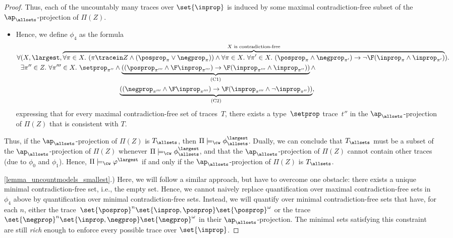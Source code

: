 \begin{proof}
Thus, each of the uncountably many traces over $\set{\inprop}$ is induced by some maximal contradiction-free subset of the $\ap_\allsets$-projection of $\Pi(Z)$.
\begin{itemize}
\item Hence, we define $\phi_4$ as the formula
\begin{align*}
\forall {}&{}(X, \largest, \overbrace{\forall \pi \in X.\ (\pi\tracein Z \wedge (\posprop_\pi \vee \negprop_\pi)) \wedge \forall \pi \in X.\ \forall \pi' \in X.\ (\posprop_\pi \wedge \negprop_{\pi'}) \rightarrow \neg \F(\inprop_{\pi} \wedge \inprop_{\pi'}) }^{\text{$X$ is contradiction-free}}).\\
&{}\exists \pi'' \in Z.\ \forall \pi''' \in X.\ \setprop_{\pi''} \wedge  \underbrace{((\posprop_{\pi'''}\wedge \F\inprop_{\pi'''}) \rightarrow \F(\inprop_{\pi'''} \wedge \inprop_{\pi''}))}_{\text{(C1)}}
\wedge \\
&{}\phantom{\exists \pi'' \in Z.\ \forall \pi''' \in X.\ \setprop_{\pi''} \wedge  }\underbrace{((\negprop_{\pi'''} \wedge \F\inprop_{\pi'''}) \rightarrow \F(\inprop_{\pi'''} \wedge \neg\inprop_{\pi''}))}_{\text{(C2)}},
\end{align*} 
expressing that for every maximal contradiction-free set of traces~$T$, there exists a type~$\setprop$ trace~$t''$ in the $\ap_\allsets$-projection of $\Pi(Z)$ that is consistent with $T$.
\end{itemize}

Thus, if the $\ap_\allsets$-projection of $\Pi(Z)$ is $T_\allsets$, then $\Pi\models_\cw\phi_\allsets^\largest$.
Dually, we can conclude that $T_\allsets$ must be a subset of the $\ap_\allsets$-projection of $\Pi(Z)$ whenever $\Pi\models_\cw \phi_\allsets^\largest$, and that the $\ap_\allsets$-projection of $\Pi(Z)$ cannot contain other traces (due to $\phi_0$ and $\phi_1$).
Hence, $\Pi \models_\cw \varphi^\largest$ if and only if the $\ap_\allsets$-projection of $\Pi(Z)$ is $T_\allsets$.

\ref{lemma_uncountmodels_smallest}.)
Here, we will follow a similar approach, but have to overcome one obstacle: there exists a unique minimal contradiction-free set, i.e., the empty set.
Hence, we cannot naively replace quantification over maximal contradiction-free sets in $\phi_4$ above by quantification over minimal contradiction-free sets. 
Instead, we will quantify over minimal contradiction-free sets that have, for each $n$, either the trace~$\set{\posprop}^n \set{\inprop,\posprop} \set{\posprop}^\omega$ or the trace~$\set{\negprop}^n \set{\inprop,\negprop} \set{\negprop}^\omega$ in their $\ap_\allsets$-projection. 
The minimal sets satisfying this constraint are still \emph{rich} enough to enforce every possible trace over $\set{\inprop}$.


\end{proof}
